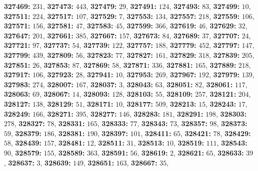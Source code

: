\textsf{\bfseries 327469:} $231$, \textsf{\bfseries 327473:} $443$, \textsf{\bfseries 327479:} $29$, \textsf{\bfseries 327491:} $124$, \textsf{\bfseries 327493:} $83$, \textsf{\bfseries 327499:} $10$, \textsf{\bfseries 327511:} $224$, \textsf{\bfseries 327517:} $107$, \textsf{\bfseries 327529:} $7$, \textsf{\bfseries 327553:} $134$, \textsf{\bfseries 327557:} $218$, \textsf{\bfseries 327559:} $106$, \textsf{\bfseries 327571:} $156$, \textsf{\bfseries 327581:} $47$, \textsf{\bfseries 327583:} $45$, \textsf{\bfseries 327599:} $366$, \textsf{\bfseries 327619:} $46$, \textsf{\bfseries 327629:} $32$, \textsf{\bfseries 327647:} $201$, \textsf{\bfseries 327661:} $385$, \textsf{\bfseries 327667:} $157$, \textsf{\bfseries 327673:} $84$, \textsf{\bfseries 327689:} $37$, \textsf{\bfseries 327707:} $24$, \textsf{\bfseries 327721:} $97$, \textsf{\bfseries 327737:} $54$, \textsf{\bfseries 327739:} $122$, \textsf{\bfseries 327757:} $188$, \textsf{\bfseries 327779:} $452$, \textsf{\bfseries 327797:} $147$, \textsf{\bfseries 327799:} $439$, \textsf{\bfseries 327809:} $56$, \textsf{\bfseries 327823:} $77$, \textsf{\bfseries 327827:} $161$, \textsf{\bfseries 327829:} $318$, \textsf{\bfseries 327839:} $205$, \textsf{\bfseries 327851:} $26$, \textsf{\bfseries 327853:} $87$, \textsf{\bfseries 327869:} $58$, \textsf{\bfseries 327871:} $336$, \textsf{\bfseries 327881:} $165$, \textsf{\bfseries 327889:} $218$, \textsf{\bfseries 327917:} $106$, \textsf{\bfseries 327923:} $28$, \textsf{\bfseries 327941:} $10$, \textsf{\bfseries 327953:} $269$, \textsf{\bfseries 327967:} $192$, \textsf{\bfseries 327979:} $139$, \textsf{\bfseries 327983:} $274$, \textsf{\bfseries 328007:} $167$, \textsf{\bfseries 328037:} $3$, \textsf{\bfseries 328043:} $63$, \textsf{\bfseries 328051:} $82$, \textsf{\bfseries 328061:} $117$, \textsf{\bfseries 328063:} $69$, \textsf{\bfseries 328067:} $14$, \textsf{\bfseries 328093:} $128$, \textsf{\bfseries 328103:} $55$, \textsf{\bfseries 328109:} $257$, \textsf{\bfseries 328121:} $204$, \textsf{\bfseries 328127:} $138$, \textsf{\bfseries 328129:} $51$, \textsf{\bfseries 328171:} $10$, \textsf{\bfseries 328177:} $509$, \textsf{\bfseries 328213:} $15$, \textsf{\bfseries 328243:} $17$, \textsf{\bfseries 328249:} $166$, \textsf{\bfseries 328271:} $395$, \textsf{\bfseries 328277:} $146$, \textsf{\bfseries 328283:} $181$, \textsf{\bfseries 328291:} $198$, \textsf{\bfseries 328303:} $278$, \textsf{\bfseries 328327:} $78$, \textsf{\bfseries 328331:} $165$, \textsf{\bfseries 328333:} $77$, \textsf{\bfseries 328343:} $73$, \textsf{\bfseries 328357:} $98$, \textsf{\bfseries 328373:} $59$, \textsf{\bfseries 328379:} $186$, \textsf{\bfseries 328381:} $190$, \textsf{\bfseries 328397:} $101$, \textsf{\bfseries 328411:} $65$, \textsf{\bfseries 328421:} $78$, \textsf{\bfseries 328429:} $58$, \textsf{\bfseries 328439:} $157$, \textsf{\bfseries 328481:} $12$, \textsf{\bfseries 328511:} $31$, \textsf{\bfseries 328513:} $10$, \textsf{\bfseries 328519:} $111$, \textsf{\bfseries 328543:} $90$, \textsf{\bfseries 328579:} $155$, \textsf{\bfseries 328589:} $363$, \textsf{\bfseries 328591:} $56$, \textsf{\bfseries 328619:} $2$, \textsf{\bfseries 328621:} $65$, \textsf{\bfseries 328633:} $39$, \textsf{\bfseries 328637:} $3$, \textsf{\bfseries 328639:} $149$, \textsf{\bfseries 328651:} $163$, \textsf{\bfseries 328667:} $35$, 
